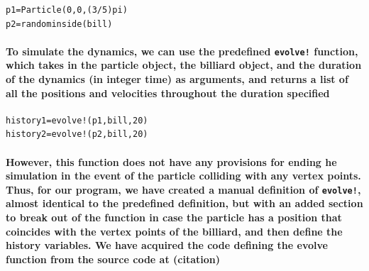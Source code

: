 \documentclass{report}
\begin{document}
\begin{lstlisting}
p1=Particle(0,0,(3/5)pi)
p2=randominside(bill)
\end{lstlisting}

\paragraph{To simulate the dynamics, we can use the predefined \verb|evolve!| function, which takes in the particle object, the billiard object, and the duration of the dynamics (in integer time) as arguments, and returns a list of all the positions and velocities throughout the duration specified}

\begin{lstlisting}
history1=evolve!(p1,bill,20)
history2=evolve!(p2,bill,20)
\end{lstlisting}


\paragraph{However, this function does not have any provisions for ending he simulation in the event of the particle colliding with any vertex points. Thus, for our program, we have created a manual definition of \verb|evolve!|, almost identical to the predefined definition, but with an added section to break out of the function in case the particle has a position that coincides with the vertex points of the billiard, and then define the history variables. We have acquired the code defining the evolve function from the source code at (citation)}
\end{document}
